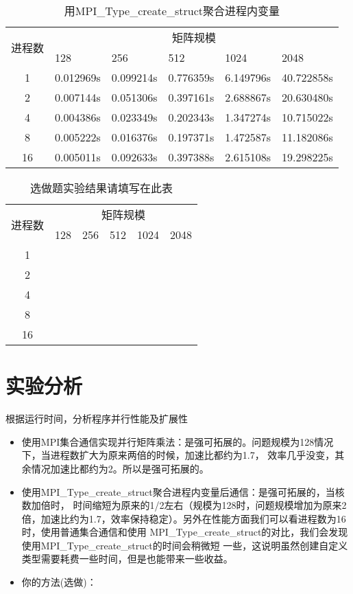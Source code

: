 \documentclass{SYSUReport}
\begin{document}
\begin{table}[htbp]
    \centering
    \caption{用MPI\_Type\_create\_struct聚合进程内变量}
    \label{表2}
    \begin{tabular}{|c|l|l|l|l|l|}
        \hline
        \multirow{2}{*}{进程数} & \multicolumn{5}{c|}{矩阵规模} \\ \cline{2-6} 
        & 128 & 256 & 512 & 1024 & 2048 \\ \hline
        1 &0.012969s&0.099214s&0.776359s&6.149796s&40.722858s\\ \hline
        2 &0.007144s&0.051306s&0.397161s&2.688867s&20.630480s\\ \hline
        4 &0.004386s&0.023349s&0.202343s&1.347274s&10.715022s\\ \hline
        8 &0.005222s&0.016376s&0.197371s&1.472587s&11.182086s\\ \hline
        16 &0.005011s&0.092633s&0.397388s&2.615108s&19.298225s\\ \hline
    \end{tabular}
\end{table}

\begin{table}[htbp]
    \centering
    \caption{选做题实验结果请填写在此表}
    \label{表3}
    \begin{tabular}{|c|l|l|l|l|l|}
        \hline
        \multirow{2}{*}{进程数} & \multicolumn{5}{c|}{矩阵规模} \\ \cline{2-6} 
        & 128 & 256 & 512 & 1024 & 2048 \\ \hline
        1 &  &  &  &  &  \\ \hline
        2 &  &  &  &  &  \\ \hline
        4 &  &  &  &  &  \\ \hline
        8 &  &  &  &  &  \\ \hline
        16 &  &  &  &  &  \\ \hline
    \end{tabular}
\end{table}

\section{实验分析}
根据运行时间，分析程序并行性能及扩展性
\begin{itemize}
    \item 使用MPI集合通信实现并行矩阵乘法：是强可拓展的。问题规模为128情况下，当进程数扩大为原来两倍的时候，加速比都约为1.7，
    效率几乎没变，其余情况加速比都约为2。所以是强可拓展的。
    \item 使用MPI\_Type\_create\_struct聚合进程内变量后通信：是强可拓展的，当核数加倍时，
    时间缩短为原来的1/2左右（规模为128时，问题规模增加为原来2倍，加速比约为1.7，效率保持稳定）。另外在性能方面我们可以看进程数为16时，使用普通集合通信和使用
    MPI\_Type\_create\_struct的对比，我们会发现使用MPI\_Type\_create\_struct的时间会稍微短
    一些，这说明虽然创建自定义类型需要耗费一些时间，但是也能带来一些收益。
    \item 你的方法(选做)：
\end{itemize}
\end{document}
